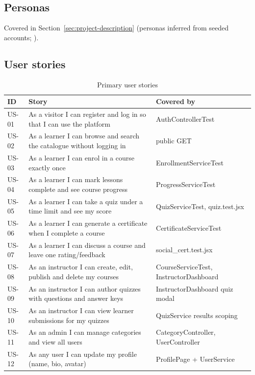 \subsection{Personas}
Covered in Section~\ref{sec:project-description} (personas inferred from seeded accounts; ).

\subsection{User stories}

\begin{table}[H]
\centering
\caption{Primary user stories}
\label{tab:user-stories}
\begin{tabular}{@{}C{1.3cm}L{9.2cm}L{3.6cm}@{}}
\toprule
\textbf{ID} & \textbf{Story} & \textbf{Covered by} \\
\midrule
US-01 & As a visitor I can register and log in so that I can use the platform & AuthControllerTest \\
US-02 & As a learner I can browse and search the catalogue without logging in & public GET  \\
US-03 & As a learner I can enrol in a course exactly once & EnrollmentServiceTest \\
US-04 & As a learner I can mark lessons complete and see course progress & ProgressServiceTest \\
US-05 & As a learner I can take a quiz under a time limit and see my score & QuizServiceTest, quiz.test.jsx \\
US-06 & As a learner I can generate a certificate when I complete a course & CertificateServiceTest \\
US-07 & As a learner I can discuss a course and leave one rating/feedback & social\_cert.test.jsx \\
US-08 & As an instructor I can create, edit, publish and delete my courses & CourseServiceTest, InstructorDashboard \\
US-09 & As an instructor I can author quizzes with questions and answer keys & InstructorDashboard quiz modal \\
US-10 & As an instructor I can view learner submissions for my quizzes & QuizService results scoping \\
US-11 & As an admin I can manage categories and view all users & CategoryController, UserController \\
US-12 & As any user I can update my profile (name, bio, avatar) & ProfilePage + UserService \\
\bottomrule
\end{tabular}
\end{table}

